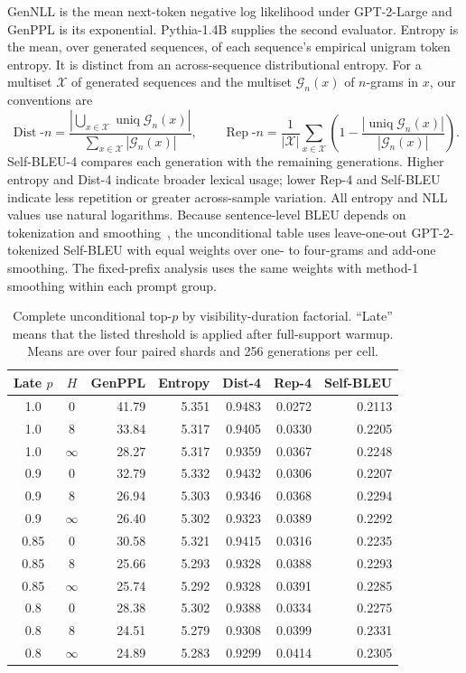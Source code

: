 \documentclass{article}
\newcommand{\1}{\mathbf 1}
\theoremstyle{definition}
\begin{document}
GenNLL is the mean next-token negative log likelihood under GPT-2-Large and
GenPPL is its exponential. Pythia-1.4B supplies the second evaluator. Entropy
is the mean, over generated sequences, of each sequence's empirical unigram
token entropy. It is distinct from an across-sequence distributional entropy.
For a multiset $\mathcal X$ of generated sequences and the multiset
$\mathcal G_n(x)$ of $n$-grams in $x$, our conventions are
\[
 \operatorname{Dist}\text{-}n
 =\frac{|\bigcup_{x\in\mathcal X}\operatorname{uniq}\mathcal G_n(x)|}
 {\sum_{x\in\mathcal X}|\mathcal G_n(x)|},
 \qquad
 \operatorname{Rep}\text{-}n
 =\frac1{|\mathcal X|}\sum_{x\in\mathcal X}
 \left(1-\frac{|\operatorname{uniq}\mathcal G_n(x)|}
 {|\mathcal G_n(x)|}\right).
\]
Self-BLEU-4 compares each
generation with the remaining generations. Higher entropy and Dist-4 indicate
broader lexical usage; lower Rep-4 and Self-BLEU indicate less repetition or
greater across-sample variation.
All entropy and NLL values use natural logarithms.
Because sentence-level BLEU depends on tokenization and
smoothing~\citep{post2018clarity,chen2014smoothing}, the unconditional table
uses leave-one-out GPT-2-tokenized Self-BLEU with equal weights over one- to
four-grams and add-one smoothing. The fixed-prefix analysis uses the same
weights with method-1 smoothing within each prompt group.

\begin{table}[H]
\centering
\small
\setlength{\tabcolsep}{4pt}
\begin{tabular}{@{}ccrrrrr@{}}
\toprule
Late $p$ & $H$ & GenPPL & Entropy & Dist-4 & Rep-4 & Self-BLEU \\
\midrule
1.0 & 0 & 41.79 & 5.351 & 0.9483 & 0.0272 & 0.2113 \\
1.0 & 8 & 33.84 & 5.317 & 0.9405 & 0.0330 & 0.2205 \\
1.0 & $\infty$ & 28.27 & 5.317 & 0.9359 & 0.0367 & 0.2248 \\
0.9 & 0 & 32.79 & 5.332 & 0.9432 & 0.0306 & 0.2207 \\
0.9 & 8 & 26.94 & 5.303 & 0.9346 & 0.0368 & 0.2294 \\
0.9 & $\infty$ & 26.40 & 5.302 & 0.9323 & 0.0389 & 0.2292 \\
0.85 & 0 & 30.58 & 5.321 & 0.9415 & 0.0316 & 0.2235 \\
0.85 & 8 & 25.66 & 5.293 & 0.9328 & 0.0388 & 0.2293 \\
0.85 & $\infty$ & 25.74 & 5.292 & 0.9328 & 0.0391 & 0.2285 \\
0.8 & 0 & 28.38 & 5.302 & 0.9388 & 0.0334 & 0.2275 \\
0.8 & 8 & 24.51 & 5.279 & 0.9308 & 0.0399 & 0.2331 \\
0.8 & $\infty$ & 24.89 & 5.283 & 0.9299 & 0.0414 & 0.2305 \\
\bottomrule
\end{tabular}
\caption{Complete unconditional top-$p$ by visibility-duration factorial. ``Late'' means
that the listed threshold is applied after full-support warmup. Means are over
four paired shards and 256 generations per cell.}
\label{tab:unconditional-full-app}
\end{table}
\end{document}
